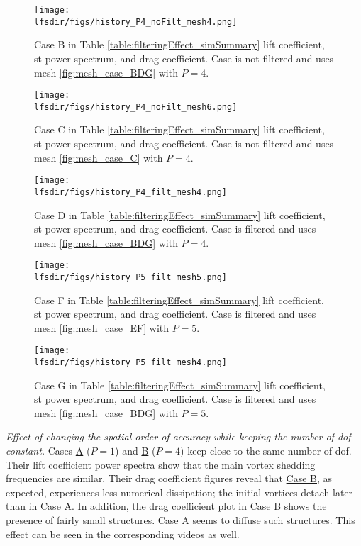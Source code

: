 \begin{figure}
\centering
\texttt{[image: \\lfsdir/figs/history\_P4\_noFilt\_mesh4.png]}
\caption{Case B in Table \ref{table:filteringEffect_simSummary} lift coefficient, \gls{st} power spectrum, and drag coefficient. Case is not filtered and uses mesh \ref{fig:mesh_case_BDG} with $P=4$.} 
\label{fig:history_P4_noFilt_mesh4}
\end{figure}

\begin{figure}
\centering
\texttt{[image: \\lfsdir/figs/history\_P4\_noFilt\_mesh6.png]}
\caption{Case C in Table \ref{table:filteringEffect_simSummary} lift coefficient, \gls{st} power spectrum, and drag coefficient. Case is not filtered and uses mesh \ref{fig:mesh_case_C} with $P=4$.} 
\label{fig:history_P4_noFilt_mesh6}
\end{figure}

\begin{figure}
\centering
\texttt{[image: \\lfsdir/figs/history\_P4\_filt\_mesh4.png]}
\caption{Case D in Table \ref{table:filteringEffect_simSummary} lift coefficient, \gls{st} power spectrum, and drag coefficient. Case is filtered and uses mesh \ref{fig:mesh_case_BDG} with $P=4$.} 
\label{fig:history_P4_filt_mesh4}
\end{figure}

\begin{figure}
\centering
\texttt{[image: \\lfsdir/figs/history\_P5\_filt\_mesh5.png]}
\caption{Case F in Table \ref{table:filteringEffect_simSummary} lift coefficient, \gls{st} power spectrum, and drag coefficient. Case is filtered and uses mesh \ref{fig:mesh_case_EF} with $P=5$.} 
\label{fig:history_P5_filt_mesh5}
\end{figure}

\begin{figure}
\centering
\texttt{[image: \\lfsdir/figs/history\_P5\_filt\_mesh4.png]}
\caption{Case G in Table \ref{table:filteringEffect_simSummary} lift coefficient, \gls{st} power spectrum, and drag coefficient. Case is filtered and uses mesh \ref{fig:mesh_case_BDG} with $P=5$.} 
\label{fig:history_P5_filt_mesh4}
\end{figure}

\emph{Effect of changing the spatial order of accuracy while keeping the number of \gls{dof} constant.} Cases \hyperlink{caseA}{A} ($P=1$) and \hyperlink{caseB}{B} ($P=4$) keep close to the same number of \gls{dof}. Their lift coefficient power spectra show that the main vortex shedding frequencies are similar. Their drag coefficient figures reveal that \hyperlink{caseB}{Case B}, as expected, experiences less numerical dissipation; the initial vortices detach later than in \hyperlink{caseA}{Case A}. In addition, the drag coefficient plot in \hyperlink{caseB}{Case B} shows the presence of fairly small structures. \hyperlink{caseA}{Case A} seems to diffuse such structures. This effect can be seen in the corresponding videos as well.

